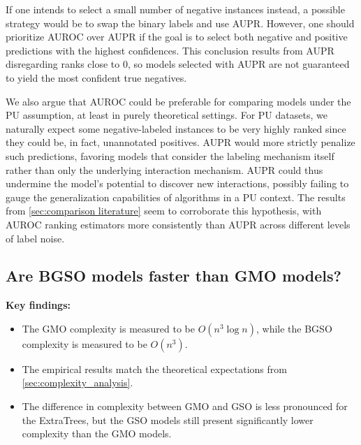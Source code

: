 If one intends to select a small number of negative instances instead, a possible strategy would be to swap the binary labels and use AUPR.
However, one should prioritize AUROC over AUPR if the goal is to select both negative and positive predictions with the highest confidences. This conclusion results from AUPR disregarding ranks close to $0$, so models selected with AUPR are not guaranteed to yield the most confident true negatives.

We also argue that AUROC could be preferable for comparing models under the PU assumption, at least in purely theoretical settings. For PU datasets, we naturally expect some negative-labeled instances to be very highly ranked since they could be, in fact, unannotated positives. AUPR would more strictly penalize such predictions, favoring models that consider the labeling mechanism itself rather than only the underlying interaction mechanism. AUPR could thus undermine the model's potential to discover new interactions, possibly failing to gauge the generalization capabilities of algorithms in a PU context. The results from \autoref{sec:comparison literature} seem to corroborate this hypothesis, with AUROC ranking estimators more consistently than AUPR across different levels of label noise.


\subsection{Are BGSO models faster than GMO models?}
\label{sec:empirical_complexity}

\begin{mdframed}
    \textbf{Key findings:}
    \begin{itemize}
        \item The GMO complexity is measured to be $O(n^3\log n)$, while the BGSO complexity is measured to be $O(n^3)$.

        \item The empirical results match the theoretical expectations from \autoref{sec:complexity_analysis}.
        
        \item The difference in complexity between GMO and GSO is less pronounced for the ExtraTrees, but the GSO models still present significantly lower complexity than the GMO models.
    \end{itemize}
\end{mdframed}

